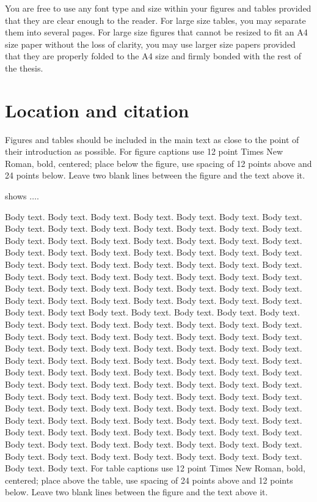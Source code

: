 You are free to use any font type and size within your figures and tables provided that they are clear enough to the reader. For large size tables, you may separate them into several pages. For large size figures that cannot be resized to fit an A4 size paper without the loss of clarity, you may use larger size papers provided that they are properly folded to the A4 size and firmly bonded with the rest of the thesis.

\section{Location and citation}

Figures and tables should be included in the main text as close to the point of their introduction as possible. For figure captions use 12 point Times New Roman, bold, centered; place below the figure, use spacing of 12 points above and 24 points below. Leave two blank lines between the figure and the text above it. 

 shows $\ldots$.



Body text. Body text. Body text. Body text. Body text. Body text. Body text. Body text. Body text. Body text. Body text. Body text. Body text. Body text. Body text. Body text. Body text. Body text. Body text. Body text. Body text. Body text. Body text. Body text. Body text. Body text. Body text. Body text. Body text. Body text. Body text. Body text. Body text. Body text. Body text. Body text. Body text. Body text. Body text. Body text. Body text. Body text. Body text. Body text. Body text. Body text. Body text. Body text. Body text. Body text. Body text. Body text. Body text. Body text. Body text. Body text. Body text. Body text
Body text. Body text. Body text. Body text. Body text. Body text. Body text. Body text. Body text. Body text. Body text. Body text. Body text. Body text. Body text. Body text. Body text. Body text. Body text. Body text. Body text. Body text. Body text. Body text. Body text. Body text. Body text. Body text. Body text. Body text. Body text. Body text. Body text. Body text. Body text. Body text. Body text. Body text. Body text. Body text. Body text. Body text. Body text. Body text. Body text. Body text. Body text. Body text. Body text. Body text. Body text. Body text. Body text. Body text. Body text. Body text. Body text. Body text. Body text. Body text. Body text. Body text. Body text. Body text. Body text. Body text. Body text. Body text. Body text. Body text. Body text. Body text. Body text. Body text. Body text. Body text. Body text. Body text. Body text. Body text. Body text. Body text. Body text. Body text. Body text. Body text. Body text. Body text. Body text. Body text. Body text.
For table captions use 12 point Times New Roman, bold, centered; place above the table, use spacing of 24 points above and 12 points below. Leave two blank lines between the figure and the text above it.

